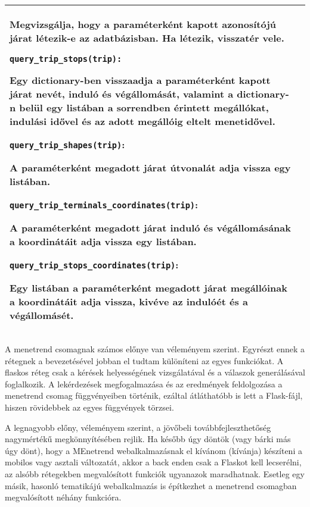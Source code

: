 \begin{longtable}{|p{4.5cm}|p{9cm}|}
Megvizsgálja, hogy a paraméterként kapott azonosítójú járat létezik-e az adatbázisban. Ha létezik, visszatér vele.

\bigskip

\texttt{query\_trip\_stops(trip):}

Egy dictionary-ben visszaadja a paraméterként kapott járat nevét, induló és végállomását, valamint a dictionary-n belül egy listában a sorrendben érintett megállókat, indulási idővel és az adott megállóig eltelt menetidővel.

\bigskip

\texttt{query\_trip\_shapes(trip)}:

A paraméterként megadott járat útvonalát adja vissza egy listában.

\bigskip

\texttt{query\_trip\_terminals\_coordinates(trip)}:

A paraméterként megadott járat induló és végállomásának a koordinátáit adja vissza egy listában.

\bigskip

\texttt{query\_trip\_stops\_coordinates(trip)}:

Egy listában a paraméterként megadott járat megállóinak a koordinátáit adja vissza, kivéve az indulóét és a végállomásét.
\\
\hline
\end{longtable}

A menetrend csomagnak számos előnye van véleményem szerint. Egyrészt ennek a rétegnek a bevezetésével jobban el tudtam különíteni az egyes funkciókat. A flaskos réteg csak a kérések helyességének vizsgálatával és a válaszok generálásával foglalkozik. A lekérdezések megfogalmazása és az eredmények feldolgozása a menetrend csomag függvényeiben történik, ezáltal átláthatóbb is lett a Flask-fájl, hiszen rövidebbek az egyes függvények törzsei.

A legnagyobb előny, véleményem szerint, a jövőbeli továbbfejleszthetőség nagymértékű megkönnyítésében rejlik. Ha később úgy döntök (vagy bárki más úgy dönt), hogy a MEnetrend webalkalmazásnak el kívánom (kívánja) készíteni a mobilos vagy asztali változatát, akkor a back enden csak a Flaskot kell lecserélni, az alsóbb rétegekben megvalósított funkciók ugyanazok maradhatnak. Esetleg egy másik, hasonló tematikájú webalkalmazás is építkezhet a menetrend csomagban megvalósított néhány funkcióra.


